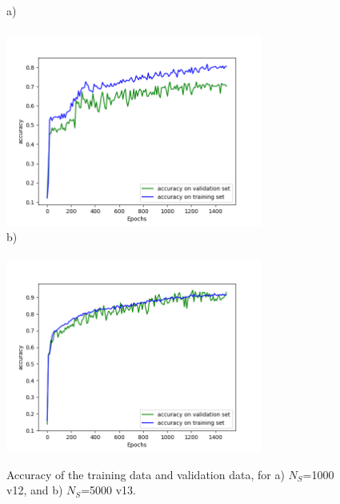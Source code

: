 \documentclass{iucr}
\newcommand{\inred}[1]{{\color{red}#1}}
\begin{document}
\begin{figure}\label{fig:v12v13}
    a)~~~~~~~~~~~~~~~~~~~~~~~~~~~~~~~~~~~~~~~~~~~~~~~~~~~~~~~~~~~\\    \includegraphics[width=0.75\textwidth]{figures/v12.png}
    b)~~~~~~~~~~~~~~~~~~~~~~~~~~~~~~~~~~~~~~~~~~~~~~~~~~~~~~~~~~~\\ \includegraphics[width=0.75\textwidth]{figures/v13.png}
    \caption{Accuracy of the training data and validation data, for a) $N_S$=1000 \inred{v12}, and b) $N_S$=5000 \inred{v13}.
    }
\end{figure}
\end{document}
